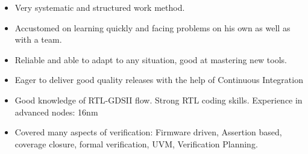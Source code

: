 

\begin{cvparagraph}
  \begin{itemize}[nosep, noitemsep]
    \item {Very systematic and structured work method.}
    \item {Accustomed on learning quickly and facing problems on his own as well as with a team.}
    \item {Reliable and able to adapt to any situation, good at mastering new tools.}
    \item {Eager to deliver good quality releases with the help of Continuous Integration}
    \item {Good knowledge of RTL-GDSII flow. Strong RTL coding skills. Experience in advanced nodes: 16nm}
    \item {Covered many aspects of verification: Firmware driven, Assertion based, coverage closure, formal verification, UVM, Verification Planning.}
  \end{itemize}
\end{cvparagraph}
